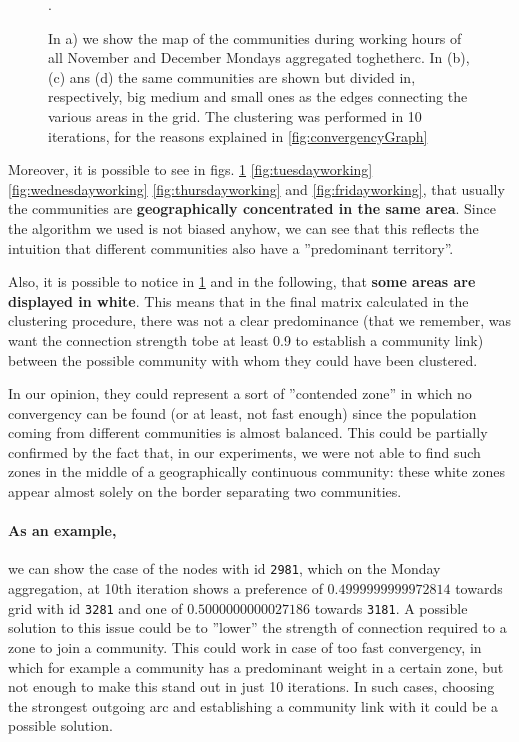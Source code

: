 \documentclass[12pt,a4paper]{article}
\begin{document}
\begin{figure}[H]
\caption{In a) we show the map of the communities during working hours of all November and December Mondays aggregated toghetherc. 
In (b), (c) ans (d) the same communities are shown but divided in, respectively, big medium and small ones as the edges connecting the various areas in the grid.
The clustering was performed in 10 iterations, for the reasons explained in \ref{fig:convergencyGraph}}.
\label{fig:mondayworking}
\end{figure}

Moreover, it is possible to see in figs. \ref{fig:mondayworking} \ref{fig:tuesdayworking} \ref{fig:wednesdayworking} \ref{fig:thursdayworking} and \ref{fig:fridayworking}, that usually the communities are \textbf{geographically concentrated in the same area}. Since the algorithm we used is not biased anyhow, we can see
that this reflects the intuition that different communities also have a ''predominant territory''.

Also, it is possible to notice in \ref{fig:mondayworking} and in the following, that 
\textbf{some areas are displayed in white}. This means that in the final matrix calculated in the clustering procedure, there was not a clear predominance (that we remember, was want the connection strength tobe at least 0.9 to establish a community link) between the possible community with whom they could have been clustered.

In our opinion, they could represent a sort of ''contended zone'' in which no convergency can be found (or at least, not fast enough) since the population coming from different communities is almost balanced. This could be partially confirmed by the fact that, in our experiments,
we were not able to find such zones in the middle of a geographically continuous community: these white zones appear almost solely on the border separating two communities.

\paragraph{As an example,} we can show the case of the nodes with id \texttt{2981}, which on the Monday aggregation, at 10th iteration shows a preference of $0.4999999999972814$ towards grid with id \texttt{3281} and one of $0.5000000000027186$ towards \texttt{3181}.
A possible solution to this issue could be to ''lower'' the strength of connection required to a zone to join a community. This could work in case of too fast convergency, in which for example a community has a predominant weight in a certain zone, but not enough to make this stand out in just 10 iterations. In such cases, choosing the strongest outgoing arc and establishing a community link with it could be a possible solution. 
\end{document}
